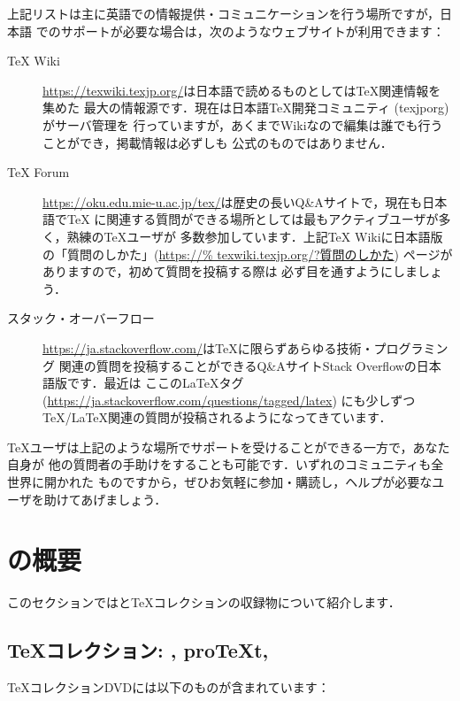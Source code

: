 \documentclass[uplatex,dvipdfmx,tombow]{jsarticle}
\begin{document}
%
\begin{janote}
上記リストは主に英語での情報提供・コミュニケーションを行う場所ですが，日本語
でのサポートが必要な場合は，次のようなウェブサイトが利用できます：
%
\begin{description}
\item[{\TeX} Wiki]
\url{https://texwiki.texjp.org/}は日本語で読めるものとしては\TeX 関連情報を集めた
最大の情報源です．現在は日本語\TeX 開発コミュニティ (texjporg) がサーバ管理を
行っていますが，あくまでWikiなので編集は誰でも行うことができ，掲載情報は必ずしも
公式のものではありません．

\item[{\TeX} Forum]
\url{https://oku.edu.mie-u.ac.jp/tex/}は歴史の長いQ\&Aサイトで，現在も日本語で\TeX
に関連する質問ができる場所としては最もアクティブユーザが多く，熟練の\TeX ユーザが
多数参加しています．上記{\TeX} Wikiに日本語版の「質問のしかた」(\url{https://%
texwiki.texjp.org/?質問のしかた}) ページがありますので，初めて質問を投稿する際は
必ず目を通すようにしましょう．

\item[スタック・オーバーフロー]
\url{https://ja.stackoverflow.com/}は\TeX に限らずあらゆる技術・プログラミング
関連の質問を投稿することができるQ\&AサイトStack Overflowの日本語版です．最近は
ここの\LaTeX タグ (\url{https://ja.stackoverflow.com/questions/tagged/latex})
にも少しずつ\TeX/\LaTeX 関連の質問が投稿されるようになってきています．
\end{description}
\end{janote}

\TeX ユーザは上記のような場所でサポートを受けることができる一方で，あなた自身が
他の質問者の手助けをすることも可能です．いずれのコミュニティも全世界に開かれた
ものですから，ぜひお気軽に参加・購読し，ヘルプが必要なユーザを助けてあげましょう．

\section{\TL の概要}
\label{sec:overview-tl}

このセクションでは\TL と\TeX コレクションの収録物について紹介します．

\subsection{\TeX コレクション: \TL, pro\TeX{}t, \MacTeX}
\label{sec:tl-coll-dists}

\TeX コレクションDVDには以下のものが含まれています：
\end{document}
